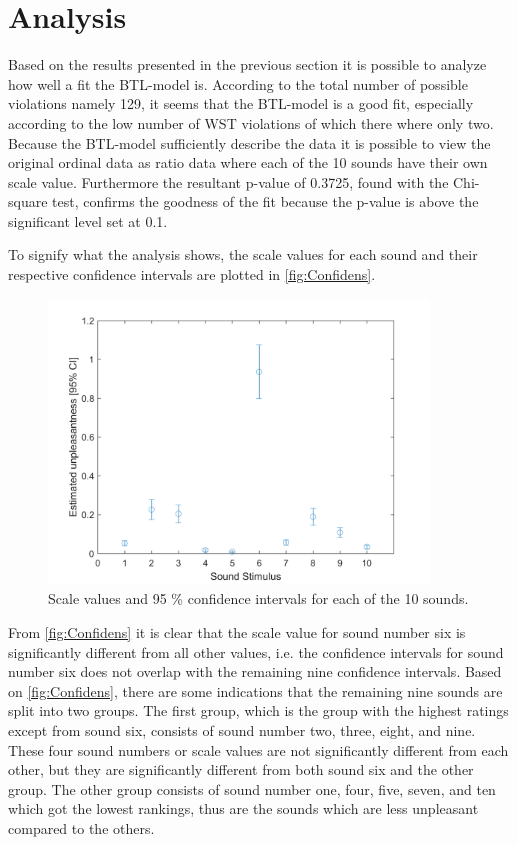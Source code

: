 \section*{Analysis}
\label{Analyse}
%
Based on the results presented in the previous section it is possible to analyze how well a fit the BTL-model is.\blankline
%
According to the total number of possible violations namely 129, it seems that the BTL-model is a good fit, especially according to the low number of WST violations of which there where only two. Because the BTL-model sufficiently describe the data it is possible to view the original ordinal data as ratio data where each of the 10 sounds have their own scale value. Furthermore the resultant p-value of 0.3725, found with the Chi-square test, confirms the goodness of the fit because the p-value is above the significant level set at 0.1.

To signify what the analysis shows, the scale values for each sound and their respective confidence intervals are plotted in \autoref{fig:Confidens}. 
%
\begin{figure}[H]
\centering
\includegraphics[width = 0.90\textwidth]{Figure/Confidens.png} 
\caption{Scale values and 95 \% confidence intervals for each of the 10 sounds.}
\label{fig:Confidens}
\end{figure}
\noindent 
%
From \autoref{fig:Confidens} it is clear that the scale value for sound number six is significantly different from all other values, i.e. the confidence intervals for sound number six does not overlap with the remaining nine confidence intervals. Based on \autoref{fig:Confidens}, there are some indications that the remaining nine sounds are split into two groups. The first group, which is the group with the highest ratings except from sound six, consists of sound number two, three, eight, and nine. These four sound numbers or scale values are not significantly different from each other, but they are significantly different from both sound six and the other group. The other group consists of sound number one, four, five, seven, and ten which got the lowest rankings, thus are the sounds which are less unpleasant compared to the others.   



